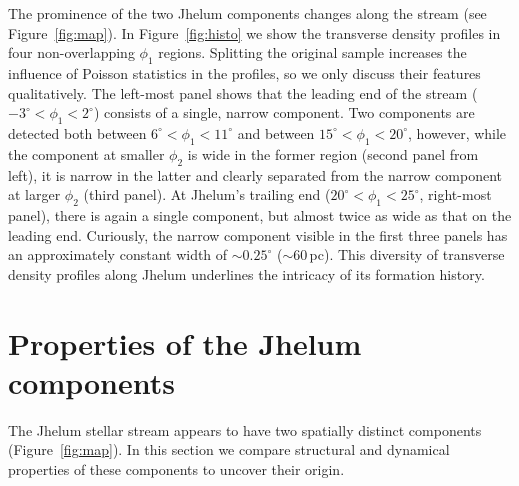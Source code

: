\documentclass[twocolumn]{aastex62}
\begin{document}
The prominence of the two Jhelum components changes along the stream (see Figure~\ref{fig:map}).
In Figure~\ref{fig:histo} we show the transverse density profiles in four non-overlapping $\phi_1$ regions.
Splitting the original sample increases the influence of Poisson statistics in the profiles, so we only discuss their features qualitatively.
The left-most panel shows that the leading end of the stream ($-3^\circ<\phi_1<2^\circ$) consists of a single, narrow component.
Two components are detected both between $6^\circ<\phi_1<11^\circ$ and between $15^\circ<\phi_1<20^\circ$, however, while the component at smaller $\phi_2$ is wide in the former region (second panel from left), it is narrow in the latter and clearly separated from the narrow component at larger $\phi_2$ (third panel).
At Jhelum's trailing end ($20^\circ<\phi_1<25^\circ$, right-most panel), there is again a single component, but almost twice as wide as that on the leading end.
Curiously, the narrow component visible in the first three panels has an approximately constant width of $\sim0.25^\circ$ ($\sim60\,$pc).
This diversity of transverse density profiles along Jhelum underlines the intricacy of its formation history.


\section{Properties of the Jhelum components}
\label{sec:origin}
The Jhelum stellar stream appears to have two spatially distinct components (Figure~\ref{fig:map}).
In this section we compare structural and dynamical properties of these components to uncover their origin.
\end{document}
